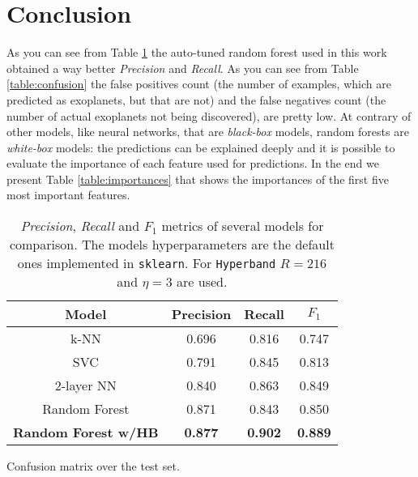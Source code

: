 \documentclass[11pt, a4paper]{article}
\begin{document}
\section{Conclusion}
  As you can see from Table \ref{table:benchmark} the auto-tuned random forest used in this work obtained a way better \textit{Precision} and \textit{Recall}. As you can see from Table \ref{table:confusion} the false positives count (the number of examples, which are predicted as exoplanets, but that are not) and the false negatives count (the number of actual exoplanets not being discovered), are pretty low. At contrary of other models, like neural networks, that are \textit{black-box} models, random forests are \textit{white-box} models: the predictions can be explained deeply and it is possible to evaluate the importance of each feature used for predictions. In the end we present Table \ref{table:importances} that shows the importances of the first five most important features.

  \begin{table}
    \centering
    \begin{tabular}{|c c c c|}
      \hline
      Model & Precision & Recall & $F_{1}$  \\
      \hline\hline
      k-NN & 0.696 & 0.816 & 0.747 \\
      \hline
      SVC & 0.791& 0.845 & 0.813 \\
      \hline
      2-layer NN & 0.840 & 0.863 & 0.849 \\
      \hline
      Random Forest & 0.871 & 0.843 & 0.850 \\
      \hline
      \textbf{Random Forest w/HB} & \textbf{0.877} & \textbf{0.902} & \textbf{0.889} \\
      \hline
    \end{tabular}
    \caption{\textit{Precision}, \textit{Recall} and $F_{1}$ metrics of several models for comparison. The models hyperparameters are the default ones implemented in \texttt{sklearn}. For \texttt{Hyperband} $R=216$ and $\eta=3$ are used.}
    \label{table:benchmark}
  \end{table}
  
  \begin{table}
    \centering
    \caption{Confusion matrix over the test set.}
    \label{table:confusion}
  \end{table}
\end{document}
